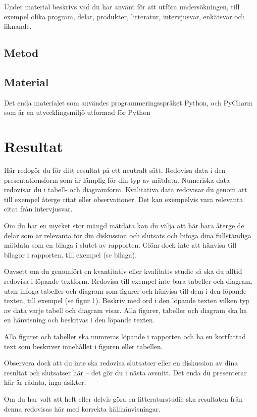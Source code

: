 \documentclass{article}
\begin{document}
Under material beskrivs vad du har använt för att utföra undersökningen, till exempel olika program, delar, produkter, litteratur, intervjusvar, enkätsvar och liknande.

\subsection{Metod}


\subsection{Material}
Det enda materialet som användes programmeringsspråket Python, och PyCharm som är en utvecklingsmiljö utformad för Python

\section{Resultat}
Här redogör du för ditt resultat på ett neutralt sätt. Redovisa data i den presentationsform som är lämplig för din typ av mätdata. Numeriska data redovisar du i tabell- och diagramform. Kvalitativa data redovisar du genom att till exempel återge citat eller observationer. Det kan exempelvis vara relevanta citat från intervjusvar.

Om du har en mycket stor mängd mätdata kan du välja att här bara återge de delar som är relevanta för din diskussion och slutsats och bifoga dina fullständiga mätdata som en bilaga i slutet av rapporten. Glöm dock inte att hänvisa till bilagor i rapporten, till exempel (se bilaga).

Oavsett om du genomfört en kvantitativ eller kvalitativ studie så ska du alltid redovisa i löpande textform. Redovisa till exempel inte bara tabeller och diagram, utan infoga tabeller och diagram som figurer och hänvisa till dem i den löpande texten, till exempel (se figur 1). Beskriv med ord i den löpande texten vilken typ av data varje tabell och diagram visar. Alla figurer, tabeller och diagram ska ha en hänvisning och beskrivas i den löpande texten.

Alla figurer och tabeller ska numreras löpande i rapporten och ha en kortfattad text som beskriver innehållet i figuren eller tabellen.

Observera dock att du inte ska redovisa slutsatser eller en diskussion av dina resultat och slutsatser här – det gör du i nästa avsnitt. Det enda du presenterar här är rådata, inga åsikter.

Om du har valt att helt eller delvis göra en litteraturstudie ska resultaten från denna redovisas här med korrekta källhänvisningar.
\end{document}
